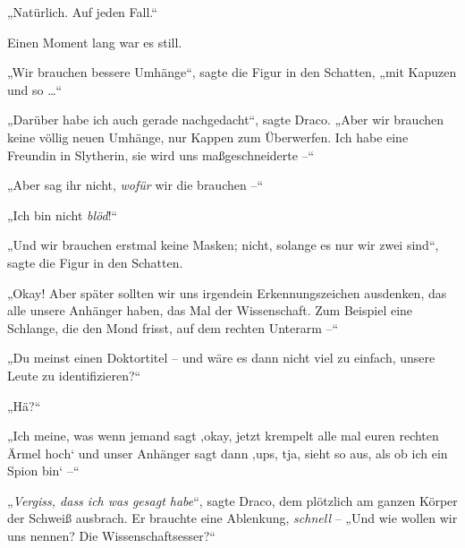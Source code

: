 „Natürlich. Auf jeden Fall.“

Einen Moment lang war es still.

„Wir brauchen bessere Umhänge“, sagte die Figur in den Schatten, „mit Kapuzen und so …“

„Darüber habe ich auch gerade nachgedacht“, sagte Draco. „Aber wir brauchen keine völlig neuen Umhänge, nur Kappen zum Überwerfen. Ich habe eine Freundin in Slytherin, sie wird uns maßgeschneiderte –“

„Aber sag ihr nicht, \emph{wofür} wir die brauchen –“

„Ich bin nicht \emph{blöd}!“

„Und wir brauchen erstmal keine Masken; nicht, solange es nur wir zwei sind“, sagte die Figur in den Schatten.

„Okay! Aber später sollten wir uns irgendein Erkennungszeichen ausdenken, das alle unsere Anhänger haben, das Mal der Wissenschaft. Zum Beispiel eine Schlange, die den Mond frisst, auf dem rechten Unterarm –“

„Du meinst einen Doktortitel – und wäre es dann nicht viel zu einfach, unsere Leute zu identifizieren?“

„Hä?“

„Ich meine, was wenn jemand sagt ‚okay, jetzt krempelt alle mal euren rechten Ärmel hoch‘ und unser Anhänger sagt dann ‚ups, tja, sieht so aus, als ob ich ein Spion bin‘ –“

„\emph{Vergiss, dass ich was gesagt habe}“, sagte Draco, dem plötzlich am ganzen Körper der Schweiß ausbrach. Er brauchte eine Ablenkung, \emph{schnell} – „Und wie wollen wir uns nennen? Die Wissenschaftsesser?“

